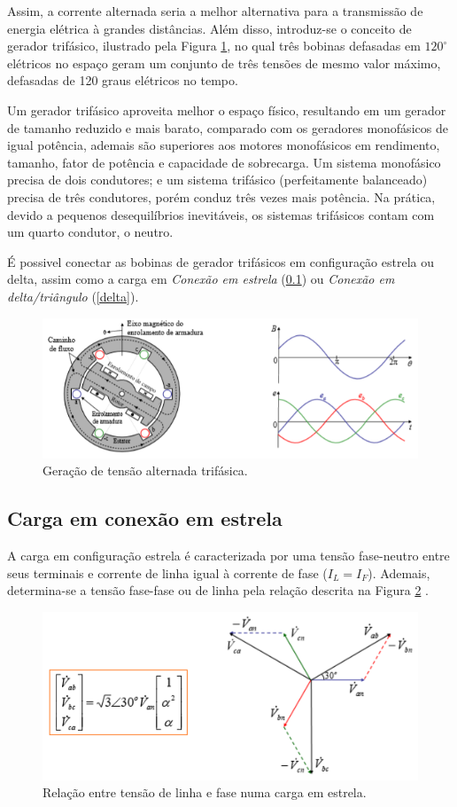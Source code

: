 \documentclass[a4paper,12pt,oneside,openany,table,xcdraw]{article}
\begin{document}
Assim, a corrente alternada seria a melhor alternativa para a transmissão de energia elétrica à grandes distâncias. Além disso, introduz-se o conceito de gerador trifásico, ilustrado pela Figura \ref{gerador}, no qual três bobinas defasadas em $120^\circ $ elétricos no espaço geram um conjunto de três tensões de mesmo valor máximo, defasadas de 120 graus elétricos no tempo.

Um gerador trifásico aproveita melhor o espaço físico, resultando em um gerador de tamanho reduzido e mais barato, comparado com os geradores monofásicos de igual potência, ademais são superiores aos motores monofásicos em rendimento, tamanho, fator de potência e capacidade de sobrecarga.
Um sistema monofásico precisa de dois condutores; e um sistema trifásico (perfeitamente balanceado) precisa de três condutores, porém conduz três vezes mais potência. Na prática, devido a pequenos desequilíbrios inevitáveis, os sistemas trifásicos contam com um quarto condutor, o neutro.

É possivel conectar as bobinas de gerador trifásicos em configuração estrela ou delta, assim como a carga em \emph{Conexão em estrela} (\ref{estrela}) ou  \emph{Conexão em delta/triângulo} (\ref{delta}).
\begin{figure}[H]
\centering
\includegraphics[width=14.5cm]{motor3phi}
\caption{Geração de tensão alternada trifásica.}
\label{gerador}
\end{figure}

\subsection{Carga em conexão em estrela} \label{estrela}
A carga em configuração estrela é caracterizada por uma tensão fase-neutro entre seus terminais e corrente de linha igual à corrente de fase ($I_L=I_F$). Ademais, determina-se a tensão fase-fase ou de linha pela relação descrita na Figura \ref{carga-estrela} \cite{irwin}. 
\begin{figure}[H]
\centering
\includegraphics[width=14cm]{carga-estrela}
\caption{Relação entre tensão de linha e fase numa carga em estrela.}
\label{carga-estrela}
\end{figure}
\end{document}
